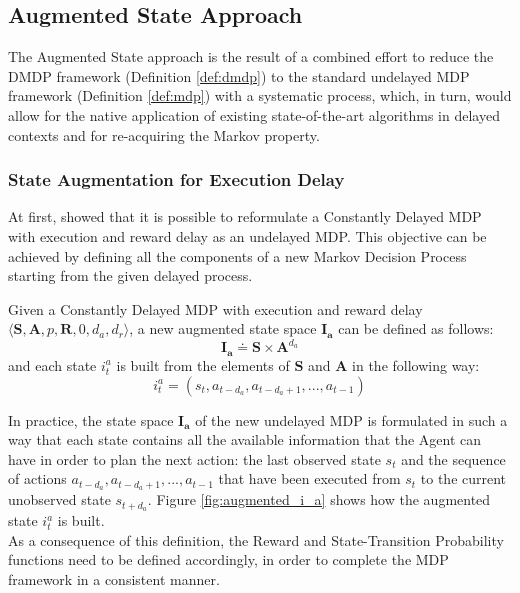         \subsection{Augmented State Approach}
            \label{subs:augmentedapproach}
            The Augmented State approach is the result of a combined effort to reduce the DMDP framework (Definition \ref{def:dmdp}) to the standard undelayed MDP framework (Definition \ref{def:mdp}) with a systematic process, which, in turn, would allow for the native application of existing state-of-the-art algorithms in delayed contexts and for re-acquiring the Markov property.
            
            \subsubsection{State Augmentation for Execution Delay}
                At first,  showed that it is possible to reformulate a Constantly Delayed MDP with execution and reward delay as an undelayed MDP. This objective can be achieved by defining all the components of a new Markov Decision Process starting from the given delayed process.
                
                \begin{definition}
                    \label{def:execaugmentstate}
                    Given a Constantly Delayed MDP with execution and reward delay $\langle \mathbf{S}, \mathbf{A}, p, \mathbf{R}, 0, d_a, d_r \rangle$,
                    a new augmented state space $\mathbf{I_{a}}$ can be defined as follows:
                    \[ \mathbf{I_{a}} \doteq \mathbf{S} \times \mathbf{A}^{d_a} \]
                    and each state $i^a_t$ is built from the elements of $\mathbf{S}$ and $\mathbf{A}$ in the following way:
                    \[ i_t^a = \left( s_t, a_{t-d_{a}}, a_{t-d_{a}+1}, ..., a_{t-1} \right)\]
                \end{definition}
                \noindent
                In practice, the state space $\mathbf{I_{a}}$ of the new undelayed MDP is formulated in such a way that each state contains all the available information that the Agent can have in order to plan the next action: the last observed state $s_t$ and the sequence of actions ${a_{t-d_{a}}, a_{t-d_{a}+1}, ..., a_{t-1}}$ that have been executed from $s_t$ to the current unobserved state $s_{t+d_{a}}$. Figure \ref{fig:augmented_i_a} shows how the augmented state $i_t^a$ is built. 
                \\
                As a consequence of this definition, the Reward and State-Transition Probability functions need to be defined accordingly, in order to complete the MDP framework in a consistent manner.
                
